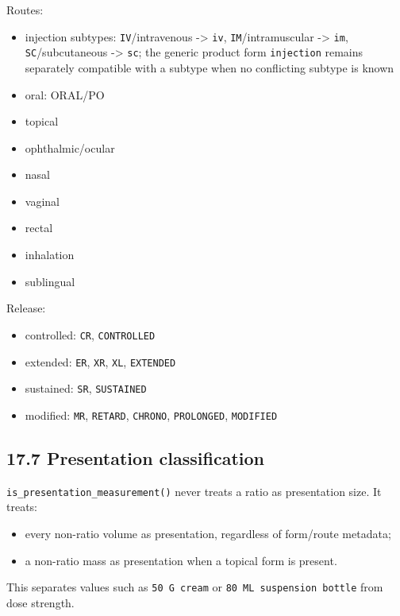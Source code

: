 Routes:

\begin{itemize}
\tightlist
\item
  injection subtypes: \texttt{IV}/intravenous -\textgreater{} \texttt{iv}, \texttt{IM}/intramuscular -\textgreater{} \texttt{im}, \texttt{SC}/subcutaneous -\textgreater{} \texttt{sc}; the generic product form \texttt{injection} remains separately compatible with a subtype when no conflicting subtype is known
\item
  oral: ORAL/PO
\item
  topical
\item
  ophthalmic/ocular
\item
  nasal
\item
  vaginal
\item
  rectal
\item
  inhalation
\item
  sublingual
\end{itemize}

Release:

\begin{itemize}
\tightlist
\item
  controlled: \texttt{CR}, \texttt{CONTROLLED}
\item
  extended: \texttt{ER}, \texttt{XR}, \texttt{XL}, \texttt{EXTENDED}
\item
  sustained: \texttt{SR}, \texttt{SUSTAINED}
\item
  modified: \texttt{MR}, \texttt{RETARD}, \texttt{CHRONO}, \texttt{PROLONGED}, \texttt{MODIFIED}
\end{itemize}

\subsection{17.7 Presentation classification}\label{177-presentation-classification}

\texttt{is\_\allowbreak{}presentation\_\allowbreak{}measurement()} never treats a ratio as presentation size. It treats:

\begin{itemize}
\tightlist
\item
  every non-ratio volume as presentation, regardless of form/route metadata;
\item
  a non-ratio mass as presentation when a topical form is present.
\end{itemize}

This separates values such as \texttt{50\ G\ cream} or \texttt{80\ ML\ suspension\ bottle} from dose strength.

